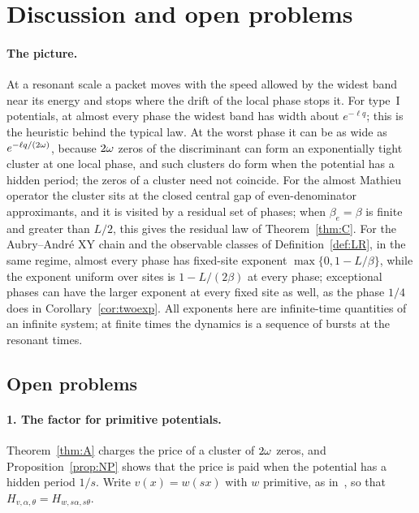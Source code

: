 \section{Discussion and open problems}\label{sec:discussion}

\paragraph{The picture.} At a resonant scale a packet moves with the speed allowed by the widest band near its energy and stops where the drift of the local phase stops it. For type~I potentials, at almost every phase the widest band has width about $e^{-\ell q}$; this is the heuristic behind the typical law. At the worst phase it can be as wide as $e^{-\ell q/(2\omega)}$, because $2\omega$ zeros of the discriminant can form an exponentially tight cluster at one local phase, and such clusters do form when the potential has a hidden period; the zeros of a cluster need not coincide. For the almost Mathieu operator the cluster sits at the closed central gap of even-denominator approximants, and it is visited by a residual set of phases; when $\beta_e=\beta$ is finite and greater than $L/2$, this gives the residual law of Theorem~\ref{thm:C}. For the Aubry--Andr\'e XY chain and the observable classes of Definition~\ref{def:LR}, in the same regime, almost every phase has fixed-site exponent $\max\{0,1-L/\beta\}$, while the exponent uniform over sites is $1-L/(2\beta)$ at every phase; exceptional phases can have the larger exponent at every fixed site as well, as the phase $1/4$ does in Corollary~\ref{cor:twoexp}. All exponents here are infinite-time quantities of an infinite system; at finite times the dynamics is a sequence of bursts at the resonant times.

\subsection{Open problems}

\paragraph{1. The factor for primitive potentials.} Theorem~\ref{thm:A} charges the price of a cluster of $2\omega$ zeros, and Proposition~\ref{prop:NP} shows that the price is paid when the potential has a hidden period $1/s$. Write $v(x)=w(sx)$ with $w$ primitive, as in~\cite[Theorem~5.29]{DMuniv}, so that $H_{v,\alpha,\theta}=H_{w,s\alpha,s\theta}$.

